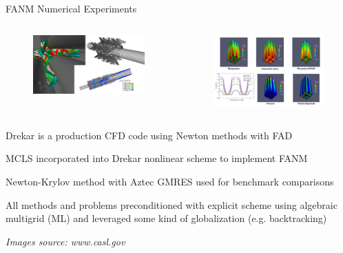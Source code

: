 \documentclass{beamer}
\begin{document}
\begin{frame}{FANM Numerical Experiments}

  \begin{columns}
    \begin{column}{0.5\textwidth}
      \begin{figure}[htpb!]
        \begin{center}
          \includegraphics[width=2.0in]{drekar1.png}
        \end{center}
      \end{figure}
    \end{column}

    \begin{column}{0.5\textwidth}
      \begin{figure}[htpb!]
        \begin{center}
          \includegraphics[width=2.0in]{drekar2.png}
        \end{center}
      \end{figure}
    \end{column}
  \end{columns}

  \medskip

  \begin{itemize}
    {\small
    \item Drekar is a production CFD code using Newton methods with
      FAD
      \medskip
    \item MCLS incorporated into Drekar nonlinear scheme to implement
      FANM
      \medskip
    \item Newton-Krylov method with Aztec GMRES used for benchmark
      comparisons
    \item All methods and problems preconditioned with explicit scheme
      using algebraic multigrid (ML) and leveraged some kind of
      globalization (e.g. backtracking) }
  \end{itemize}

  {\small \sl Images source: www.casl.gov}

\end{frame}
\end{document}
